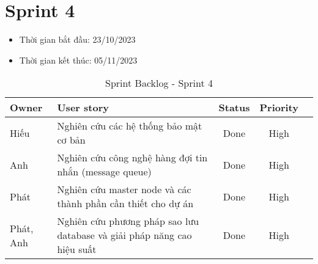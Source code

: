 \section{Sprint 4}
\begin{itemize}
    \item Thời gian bắt đầu: 23/10/2023
    \item Thời gian kết thúc: 05/11/2023
\end{itemize}
\begin{table}[H]
    \begin{tabular}{|m{2.5cm}|m{9cm}|c|c|c|}
    \hline
    \textbf{Owner}  & \textbf{User story}                                & \textbf{Status}  & \textbf{Priority} \\ \hline
    Hiếu                & Nghiên cứu các hệ thống bảo mật cơ bản                      & Done                              & High           \\ \hline
    Anh                 & Nghiên cứu công nghệ hàng đợi tin nhắn (message queue)                       & Done                              & High           \\ \hline
    Phát                & Nghiên cứu master node và các thành phần cần thiết cho dự án                      & Done                              & High           \\ \hline
    Phát, Anh                & Nghiên cứu phương pháp sao lưu database và giải pháp năng cao hiệu suất                      & Done                              & High           \\ \hline
    \end{tabular}
    \caption{Sprint Backlog - Sprint 4}
    \label{tab:sprint-4}
\end{table}
